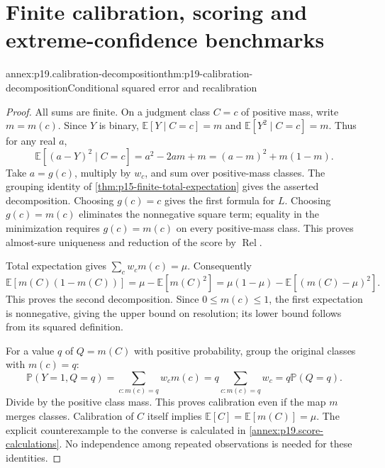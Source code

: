 \section{Finite calibration, scoring and extreme-confidence benchmarks}
\label{sec:annex-p19-calibration-extreme-confidence}

\begin{annexitem}{annex:p19.calibration-decomposition}{thm:p19-calibration-decomposition}{Conditional squared error and recalibration}
\begin{proof}
All sums are finite. On a judgment class \(C=c\) of positive mass, write
\(m=m(c)\). Since \(Y\) is binary, \(\mathbb E[Y\mid C=c]=m\)
and \(\mathbb E[Y^2\mid C=c]=m\). Thus for any real \(a\),
\[
 \mathbb E[(a-Y)^2\mid C=c]
 =a^2-2am+m=(a-m)^2+m(1-m).
\]
Take \(a=g(c)\), multiply by \(w_c\), and sum over positive-mass
classes. The grouping identity of \cref{thm:p15-finite-total-expectation}
gives the asserted decomposition. Choosing \(g(c)=c\) gives the first
formula for \(L\). Choosing \(g(c)=m(c)\) eliminates the nonnegative
square term; equality in the minimization requires \(g(c)=m(c)\) on
every positive-mass class. This proves almost-sure uniqueness and reduction
of the score by \(\operatorname{Rel}\).

Total expectation gives \(\sum_c w_cm(c)=\mu\). Consequently
\[
 \mathbb E[m(C)(1-m(C))]
 =\mu-\mathbb E[m(C)^2]
 =\mu(1-\mu)-\mathbb E[(m(C)-\mu)^2].
\]
This proves the second decomposition. Since \(0\leq m(c)\leq1\),
the first expectation is nonnegative, giving the upper bound on resolution;
its lower bound follows from its squared definition.

For a value \(q\) of \(Q=m(C)\) with positive probability, group the
original classes with \(m(c)=q\):
\[
 \mathbb P(Y=1,Q=q)=\sum_{c:m(c)=q}w_cm(c)
 =q\sum_{c:m(c)=q}w_c=q\mathbb P(Q=q).
\]
Divide by the positive class mass. This proves calibration even if the map
\(m\) merges classes. Calibration of \(C\) itself implies
\(\mathbb E[C]=\mathbb E[m(C)]=\mu\). The explicit counterexample
to the converse is calculated in \cref{annex:p19.score-calculations}.
No independence among repeated observations is needed for these identities.
\end{proof}
\end{annexitem}

